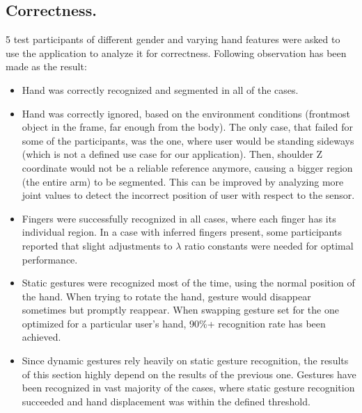 \documentclass[a4paper,11pt,oneside]{article}
\begin{document}
\subsection{Correctness.}
5 test participants of different gender and varying hand features were asked to use the application to analyze it for correctness. Following observation has been made as the result:\\

\begin{itemize}
\item Hand was correctly recognized and segmented in all of the cases.
\item Hand was correctly ignored, based on the environment conditions (frontmost object in the frame, far enough from the body). The only case, that failed for some of the participants, was the one, where user would be standing sideways (which is not a defined use case for our application). Then, shoulder Z coordinate would not be a reliable reference anymore, causing a bigger region (the entire arm) to be segmented. This can be improved by analyzing more joint values to detect the incorrect position of user with respect to the sensor.
\item Fingers were successfully recognized in all cases, where each finger has its individual region. In a case with inferred fingers present, some participants reported that slight adjustments to $\lambda$ ratio constants were needed for optimal performance.
\item Static gestures were recognized most of the time, using the normal position of the hand. When trying to rotate the hand, gesture would disappear sometimes but promptly reappear. When swapping gesture set for the one optimized for a particular user's hand, 90\%+ recognition rate has been achieved.
\item Since dynamic gestures rely heavily on static gesture recognition, the results of this section highly depend on the results of the previous one. Gestures have been recognized in vast majority of the cases, where static gesture recognition succeeded and hand displacement was within the defined threshold. 
\end{itemize}
\end{document}
